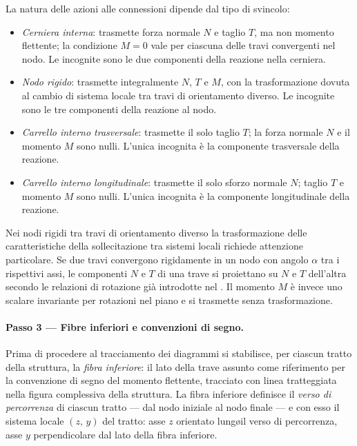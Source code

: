 La natura delle azioni alle connessioni dipende
dal tipo di svincolo:
\begin{itemize}
	\item \emph{Cerniera interna}: trasmette
	forza normale $N$ e taglio $T$, ma non
	momento flettente; la condizione $M = 0$
	vale per ciascuna delle travi convergenti
	nel nodo. Le incognite sono le due componenti
	della reazione nella cerniera.
	
	\item \emph{Nodo rigido}: trasmette
	integralmente $N$, $T$ e $M$, con la
	trasformazione dovuta al cambio di sistema
	locale tra travi di orientamento diverso.
	Le incognite sono le tre componenti della
	reazione al nodo.
	
	\item \emph{Carrello interno trasversale}:
	trasmette il solo taglio $T$; la forza
	normale $N$ e il momento $M$ sono nulli.
	L'unica incognita è la componente
	trasversale della reazione.
	
	\item \emph{Carrello interno longitudinale}:
	trasmette il solo sforzo normale $N$;
	taglio $T$ e momento $M$ sono nulli.
	L'unica incognita è la componente
	longitudinale della reazione.
\end{itemize}

\begin{oss}
	Nei nodi rigidi tra travi di orientamento
	diverso la trasformazione delle caratteristiche
	della sollecitazione tra sistemi locali richiede
	attenzione particolare. Se due travi convergono
	rigidamente in un nodo con angolo $\alpha$ tra
	i rispettivi assi, le componenti $N$ e $T$
	di una trave si proiettano su $N$ e $T$
	dell'altra secondo le relazioni di rotazione
	già introdotte nel .
	Il momento $M$ è invece uno scalare invariante
	per rotazioni nel piano e si trasmette senza
	trasformazione.
\end{oss}

\paragraph{Passo 3 --- Fibre inferiori e
	convenzioni di segno.}

Prima di procedere al tracciamento dei diagrammi
si stabilisce, per ciascun tratto della struttura,
la \emph{fibra inferiore}: il lato della trave
assunto come riferimento per la convenzione di
segno del momento flettente, tracciato con linea
tratteggiata nella figura complessiva della
struttura. La fibra inferiore definisce il
\emph{verso di percorrenza} di ciascun tratto
--- dal nodo iniziale al nodo finale --- e con
esso il sistema locale $(z,\,y)$ del tratto:
asse $z$ orientato lung\o il verso di percorrenza,
asse $y$ perpendicolare dal lato della fibra
inferiore.

